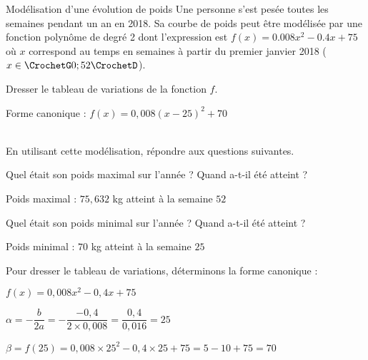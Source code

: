 \begin{EXO}{Modélisation d'une évolution de poids}{}
Une personne s'est pesée toutes les semaines pendant un an en 2018. Sa courbe de poids peut être modélisée par une fonction polynôme de degré 2 dont l'expression est $f(x)=0.008x^2-0.4x+75$ où $x$ correspond au temps en semaines à partir du premier janvier 2018 ($x\in \CrochetG0;52\CrochetD$).
\begin{tcbenumerate}[2]
\tcbitem {} Dresser le tableau de variations de la fonction $f$.
\begin{crep}[colback=white,colframe=white]
Forme canonique : $f(x) = 0{,}008(x-25)^2 + 70$\\\\

\end{crep}

\tcbitem[colframe=black,boxrule=0.4pt] En utilisant cette modélisation, répondre aux questions suivantes.
\begin{tcbenumerate}[2][1][alph]
\tcbitem {} Quel était son poids maximal sur l'année ? Quand a-t-il été atteint ?

\begin{crep}
Poids maximal : $75{,}632$ kg atteint à la semaine $52$
\end{crep}

\tcbitem {} Quel était son poids minimal sur l'année ? Quand a-t-il été atteint ?

\begin{crep}
Poids minimal : $70$ kg atteint à la semaine $25$
\end{crep}
\end{tcbenumerate}
\end{tcbenumerate}

\exocorrection

\begin{tcbenumerate}[2]
\tcbitem Pour dresser le tableau de variations, déterminons la forme canonique :

$f(x) = 0{,}008x^2 - 0{,}4x + 75$

$\alpha = -\dfrac{b}{2a} = -\dfrac{-0{,}4}{2 \times 0{,}008} = \dfrac{0{,}4}{0{,}016} = 25$

$\beta = f(25) = 0{,}008 \times 25^2 - 0{,}4 \times 25 + 75 = 5 - 10 + 75 = 70$


\end{tcbenumerate}
\end{EXO}
